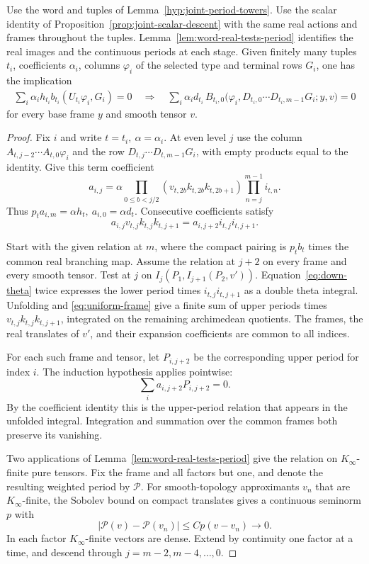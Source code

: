 \begin{lemma}\label{lem:joint-period}
Use the word and tuples of Lemma~\ref{hyp:joint-period-towers}. Use the scalar
identity of Proposition~\ref{prop:joint-scalar-descent} with the
same real actions and frames throughout the tuples. Lemma~\ref{lem:word-real-tests-period} identifies the real images and the
continuous periods at each stage. Given finitely
many tuples \(t_i\), coefficients \(\alpha_i\), columns
\(\varphi_i\) of the selected type and terminal rows \(G_i\), one
has the implication
\begin{align*}
 \sum_i\alpha_i h_{t_i} b_{t_i}(U_{t_i}\varphi_i,G_i)=0
 \quad\Longrightarrow\quad
  \sum_i\alpha_i d_{t_i}\,
  B_{t_i,0}\bigl(\varphi_i,D_{t_i,0}\cdots
       D_{t_i,m-1}G_i;y,v\bigr)=0
\end{align*}
for every base frame \(y\) and smooth tensor \(v\).
\end{lemma}

\begin{proof}
Fix \(i\) and write \(t=t_i,\ \alpha=\alpha_i\). At even level \(j\)
use the column \(A_{t,j-2}\cdots A_{t,0}\varphi_i\) and the row
\(D_{t,j}\cdots D_{t,m-1}G_i\), with empty products equal
to the identity. Give this term coefficient
\[
 a_{i,j}=\alpha
 \prod_{0\le b<j/2}(v_{t,2b}k_{t,2b}k_{t,2b+1})
 \prod_{n=j}^{m-1}i_{t,n}.
\]
Thus \(p_ta_{i,m}=\alpha h_t,\ a_{i,0}=\alpha d_t\). Consecutive
coefficients satisfy
\[
 a_{i,j}v_{t,j}k_{t,j}k_{t,j+1}
    =a_{i,j+2}i_{t,j}i_{t,j+1}.
\]

Start with the given relation at \(m\), where the compact pairing
is \(p_tb_t\) times the common real branching map. Assume the
relation at \(j+2\) on every frame and every smooth tensor.
Test at \(j\) on \(I_j(P_1,I_{j+1}(P_2,v'))\).
Equation~\eqref{eq:down-theta} twice expresses the lower period
times \(i_{t,j}i_{t,j+1}\) as a double theta integral. Unfolding
and \eqref{eq:uniform-frame} give a finite sum of upper periods
times \(v_{t,j}k_{t,j}k_{t,j+1}\), integrated on the remaining
archimedean quotients. The frames, the real translates of \(v'\), and their expansion coefficients are common to all indices.

For each such frame and tensor, let \(P_{i,j+2}\) be the corresponding upper period for index \(i\). The induction hypothesis applies pointwise:
\[
 \sum_i a_{i,j+2}P_{i,j+2}=0 .
\]
By the coefficient identity this is the upper-period relation that appears in the unfolded integral. Integration and summation over the common frames both preserve its vanishing.

Two applications of Lemma~\ref{lem:word-real-tests-period} give the relation on \(K_\infty\)-finite
pure tensors. Fix the frame and all factors but one, and denote the resulting
weighted period by \(\mathcal P\). For smooth-topology approximants
\(v_n\) that are \(K_\infty\)-finite, the Sobolev bound on compact
translates gives a continuous seminorm \(p\) with
\[
 |\mathcal P(v)-\mathcal P(v_n)|\le C p(v-v_n)\longrightarrow0 .
\] In each factor
\(K_\infty\)-finite vectors are dense. Extend by continuity one
factor at a time, and descend through \(j=m-2,m-4,\ldots,0\).
\end{proof}

